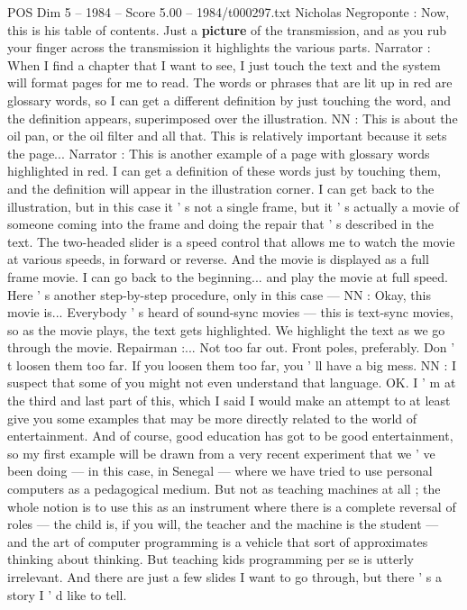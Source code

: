 \begin{textsample}{POS Dim 5 – 1984 – Score 5.00 – 1984/t000297.txt}
Nicholas Negroponte : Now, this is his table of contents.
Just a \textbf{picture} of the transmission, and as you rub your finger across the transmission it highlights the various parts.
Narrator : When I find a chapter that I want to see, I just touch the text and the system will format pages for me to read.
The words or phrases that are lit up in red are glossary words, so I can get a different definition by just touching the word, and the definition appears, superimposed over the illustration.
NN : This is about the oil pan, or the oil filter and all that.
This is relatively important because it sets the page...
Narrator : This is another example of a page with glossary words highlighted in red.
I can get a definition of these words just by touching them, and the definition will appear in the illustration corner.
I can get back to the illustration, but in this case it ' s not a single frame, but it ' s actually a movie of someone coming into the frame and doing the repair that ' s described in the text.
The two-headed slider is a speed control that allows me to watch the movie at various speeds, in forward or reverse.
And the movie is displayed as a full frame movie.
I can go back to the beginning... and play the movie at full speed.
Here ' s another step-by-step procedure, only in this case — NN : Okay, this movie is...
Everybody ' s heard of sound-sync movies — this is text-sync movies, so as the movie plays, the text gets highlighted.
We highlight the text as we go through the movie.
Repairman :...
Not too far out.
Front poles, preferably.
Don ' t loosen them too far.
If you loosen them too far, you ' ll have a big mess.
NN : I suspect that some of you might not even understand that language.
OK.
I ' m at the third and last part of this, which I said I would make an attempt to at least give you some examples that may be more directly related to the world of entertainment.
And of course, good education has got to be good entertainment, so my first example will be drawn from a very recent experiment that we ' ve been doing — in this case, in Senegal — where we have tried to use personal computers as a pedagogical medium.
But not as teaching machines at all ; the whole notion is to use this as an instrument where there is a complete reversal of roles — the child is, if you will, the teacher and the machine is the student — and the art of computer programming is a vehicle that sort of approximates thinking about thinking.
But teaching kids programming per se is utterly irrelevant.
And there are just a few slides I want to go through, but there ' s a story I ' d like to tell.

\end{textsample}
